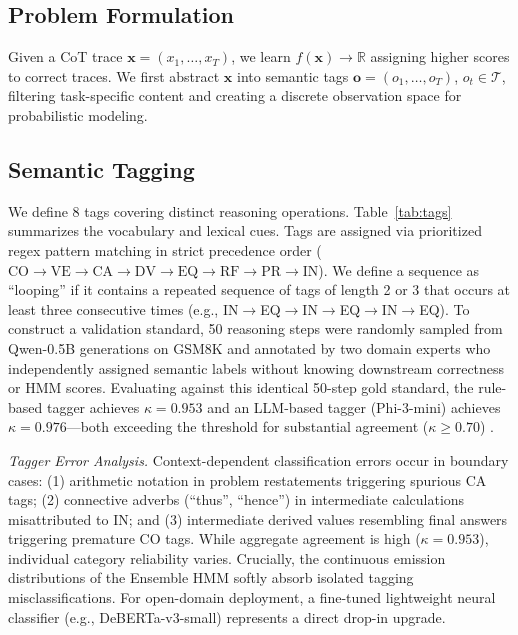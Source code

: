 \documentclass[conference]{IEEEtran}
\begin{document}
\subsection{Problem Formulation}

Given a CoT trace $\mathbf{x} = (x_1, \ldots, x_T)$, we learn $f(\mathbf{x}) \rightarrow \mathbb{R}$ assigning higher scores to correct traces. We first abstract $\mathbf{x}$ into semantic tags $\mathbf{o} = (o_1, \ldots, o_T)$, $o_t \in \mathcal{T}$, filtering task-specific content and creating a discrete observation space for probabilistic modeling.

\subsection{Semantic Tagging}

We define 8 tags covering distinct reasoning operations. Table~\ref{tab:tags} summarizes the vocabulary and lexical cues. Tags are assigned via prioritized regex pattern matching in strict precedence order ($\text{CO} \to \text{VE} \to \text{CA} \to \text{DV} \to \text{EQ} \to \text{RF} \to \text{PR} \to \text{IN}$). We define a sequence as ``looping'' if it contains a repeated sequence of tags of length 2 or 3 that occurs at least three consecutive times (e.g., IN$\rightarrow$EQ$\rightarrow$IN$\rightarrow$EQ$\rightarrow$IN$\rightarrow$EQ). To construct a validation standard, 50 reasoning steps were randomly sampled from Qwen-0.5B generations on GSM8K and annotated by two domain experts who independently assigned semantic labels without knowing downstream correctness or HMM scores. Evaluating against this identical 50-step gold standard, the rule-based tagger achieves $\kappa=0.953$ and an LLM-based tagger (Phi-3-mini) achieves $\kappa=0.976$---both exceeding the threshold for substantial agreement ($\kappa\ge0.70$) \cite{landis1977measurement}.

\textit{Tagger Error Analysis.} Context-dependent classification errors occur in boundary cases: (1) arithmetic notation in problem restatements triggering spurious CA tags; (2) connective adverbs (``thus'', ``hence'') in intermediate calculations misattributed to IN; and (3) intermediate derived values resembling final answers triggering premature CO tags. While aggregate agreement is high ($\kappa=0.953$), individual category reliability varies. Crucially, the continuous emission distributions of the Ensemble HMM softly absorb isolated tagging misclassifications. For open-domain deployment, a fine-tuned lightweight neural classifier (e.g., DeBERTa-v3-small) represents a direct drop-in upgrade.
\end{document}
